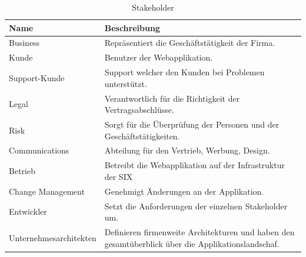 \begin{table}[H]
	\centering
	\caption{Stakeholder}
	\begin{tabular}{ | p{2cm} | p{14cm} | }
		\toprule
		{\textbf{Name}} & {\textbf{Beschreibung}} \\
		\midrule
		Business & Repräsentiert die Geschäftstätigkeit der Firma.\\ \hline
		Kunde & Benutzer der Webapplikation. \\ \hline
		Support-Kunde & Support welcher den Kunden bei Problemen unterstützt. \\ \hline
		Legal &  Verantwortlich für die Richtigkeit der Vertragsabschlüsse. \\ \hline
		Risk & Sorgt für die Überprüfung der Personen und der Geschäftstätigkeiten. \\ \hline
		Communications & Abteilung für den Vertrieb, Werbung, Design. \\ \hline
		Betrieb & Betreibt die Webapplikation auf der Infrastruktur der SIX \\ \hline
		Change Management & Genehmigt Änderungen an der Applikation. \\ \hline
		Entwickler & Setzt die Anforderungen der einzelnen Stakeholder um. \\  \hline
		Unternehmesarchitekten & Definieren firmenweite Architekturen und haben den gesamtüberblick über die Applikationslandschaf.\\ 
		\bottomrule
	\end{tabular}
\end{table}